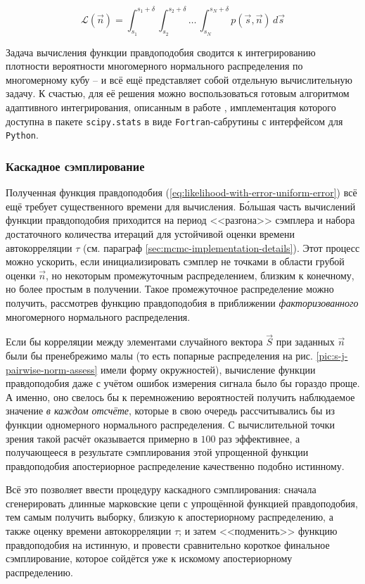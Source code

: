 \documentclass[12pt]{book}
\begin{document}
	\begin{equation}
		\label{eq:likelihood-with-error-uniform-error}
		\mathcal{L}(\vec{n}) = \int_{s_1}^{s_1 + \delta} \int_{s_2}^{s_2 + \delta} \ldots \, \int_{s_{N}}^{s_N + \delta} p(\vec{s}, \vec{n}) \, d\vec{s}
	\end{equation}

	Задача вычисления функции правдоподобия сводится к интегрированию плотности вероятности многомерного нормального распределения по многомерному кубу -- и всё ещё представляет собой отдельную вычислительную задачу. К счастью, для её решения можно воспользоваться готовым алгоритмом адаптивного интегрирования, описанным в работе \cite{Genz1992}, имплементация которого доступна в пакете \verb|scipy.stats| \cite{2020SciPy-NMeth} в виде \verb|Fortran|-сабрутины с интерфейсом для \verb|Python|.

	\subsubsection{Каскадное сэмплирование}
	
	Полученная функция правдоподобия (\ref{eq:likelihood-with-error-uniform-error}) всё ещё требует существенного времени для вычисления. Б\'{о}льшая часть вычислений функции правдоподобия приходится на период <<разгона>> сэмплера и набора достаточного количества итераций для устойчивой оценки времени автокорреляции $\tau$ (см. параграф \ref{sec:mcmc-implementation-details}). Этот процесс можно ускорить, если инициализировать сэмплер не точками в области грубой оценки $\vec{n}$, но некоторым промежуточным распределением, близким к конечному, но более простым в получении. Такое промежуточное распределение можно получить, рассмотрев функцию правдоподобия в приближении \textit{факторизованного} многомерного нормального распределения.
	
	Если бы корреляции между элементами случайного вектора $\vec{S}$ при заданных $\vec{n}$ были бы пренебрежимо малы (то есть попарные распределения на рис. \ref{pic:s-j-pairwise-norm-assess} имели форму окружностей), вычисление функции правдоподобия даже с учётом ошибок измерения сигнала было бы гораздо проще. А именно, оно свелось бы к перемножению вероятностей получить наблюдаемое значение \textit{в каждом отсчёте}, которые в свою очередь рассчитывались бы из функции одномерного нормального распределения. С вычислительной точки зрения такой расчёт оказывается примерно в $100$ раз эффективнее, а получающееся в результате сэмплирования этой упрощенной функции правдоподобия апостериорное распределение качественно подобно истинному.

	Всё это позволяет ввести процедуру каскадного сэмплирования: сначала сгенерировать длинные марковские цепи с упрощённой функцией правдоподобия, тем самым получить выборку, близкую к апостериорному распределению, а также оценку времени автокорреляции $\tau$; и затем <<подменить>> функцию правдоподобия на истинную, и провести сравнительно короткое финальное сэмплирование, которое сойдётся уже к искомому апостериорному распределению.


	\printbibliography
	
\end{document}
